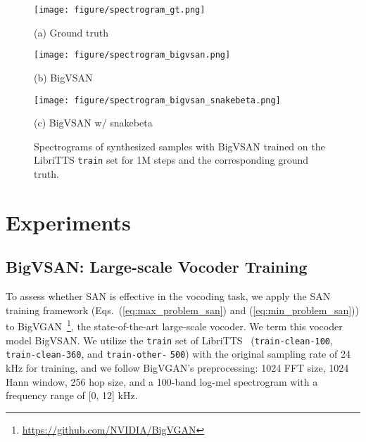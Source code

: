 \documentclass{article}
\def\beqref#1{(\ref{#1})}
\begin{document}
\begin{figure*}[htb]
\begin{minipage}[b]{0.3\linewidth}
  \centering
  \centerline{\texttt{[image: figure/spectrogram\_gt.png]}}
  \centerline{(a) Ground truth}\medskip
\end{minipage}
\hfill
\begin{minipage}[b]{.3\linewidth}
  \centering
  \centerline{\texttt{[image: figure/spectrogram\_bigvsan.png]}}
  \centerline{(b) BigVSAN}\medskip
\end{minipage}
\hfill
\begin{minipage}[b]{0.3\linewidth}
  \centering
  \centerline{\texttt{[image: figure/spectrogram\_bigvsan\_snakebeta.png]}}
  \centerline{(c) BigVSAN w/ snakebeta}\medskip
\end{minipage}
\caption{Spectrograms of synthesized samples with BigVSAN trained on the LibriTTS \texttt{train} set for 1M steps and the corresponding ground truth.}
\label{fig:comparision_spectrograms}
\end{figure*}

\section{Experiments}
\label{sec:experiments}

\subsection{BigVSAN: Large-scale Vocoder Training}

To assess whether SAN is effective in the vocoding task, we apply the SAN training framework (Eqs.~\beqref{eq:max_problem_san} and \beqref{eq:min_problem_san}) to BigVGAN~\cite{lee2023bigvgan}\footnote{\url{https://github.com/NVIDIA/BigVGAN}}, the state-of-the-art large-scale vocoder. We term this vocoder model BigVSAN. We utilize the \texttt{train} set of LibriTTS~\cite{zen2019libritts} (\texttt{train-clean-100}, \texttt{train-clean-360}, and \texttt{train-other-} \texttt{500}) with the original sampling rate of 24 kHz for training, and we follow BigVGAN's preprocessing: 1024 FFT size, 1024 Hann window, 256 hop size, and a 100-band log-mel spectrogram with a frequency range of [0, 12] kHz.
\end{document}
